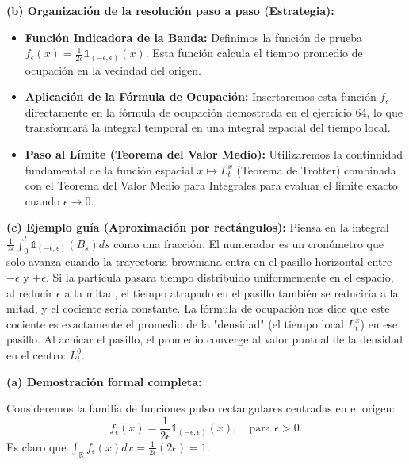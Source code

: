 \documentclass[11pt, letterpaper]{article}
\begin{document}
\vspace{5mm}

\begin{solucion}
    \textbf{(b) Organización de la resolución paso a paso (Estrategia):}
    \begin{itemize}
        \item[(i)] \textbf{Función Indicadora de la Banda:} Definimos la función de prueba $f_\epsilon(x) = \frac{1}{2\epsilon} \mathbb{1}_{(-\epsilon, \epsilon)}(x)$. Esta función calcula el tiempo promedio de ocupación en la vecindad del origen.
        \item[(ii)] \textbf{Aplicación de la Fórmula de Ocupación:} Insertaremos esta función $f_\epsilon$ directamente en la fórmula de ocupación demostrada en el ejercicio 64, lo que transformará la integral temporal en una integral espacial del tiempo local.
        \item[(iii)] \textbf{Paso al Límite (Teorema del Valor Medio):} Utilizaremos la continuidad fundamental de la función espacial $x \mapsto L_t^x$ (Teorema de Trotter) combinada con el Teorema del Valor Medio para Integrales para evaluar el límite exacto cuando $\epsilon \to 0$.
    \end{itemize}

    \vspace{3mm}
    \textbf{(c) Ejemplo guía (Aproximación por rectángulos):}
    Piensa en la integral $\frac{1}{2\epsilon} \int_0^t \mathbb{1}_{(-\epsilon, \epsilon)}(B_s) ds$ como una fracción. El numerador es un cronómetro que solo avanza cuando la trayectoria browniana entra en el pasillo horizontal entre $-\epsilon$ y $+\epsilon$. 
    Si la partícula pasara tiempo distribuido uniformemente en el espacio, al reducir $\epsilon$ a la mitad, el tiempo atrapado en el pasillo también se reduciría a la mitad, y el cociente sería constante.
    La fórmula de ocupación nos dice que este cociente es exactamente el promedio de la "densidad" (el tiempo local $L_t^x$) en ese pasillo. Al achicar el pasillo, el promedio converge al valor puntual de la densidad en el centro: $L_t^0$.

    \vspace{3mm}
    \textbf{(a) Demostración formal completa:}

    Consideremos la familia de funciones pulso rectangulares centradas en el origen:
    \[ f_\epsilon(x) = \frac{1}{2\epsilon} \mathbb{1}_{(-\epsilon, \epsilon)}(x), \quad \text{para } \epsilon > 0. \]
    Es claro que $\int_{\mathbb{R}} f_\epsilon(x) dx = \frac{1}{2\epsilon} (2\epsilon) = 1$.


\end{solucion}
\end{document}
